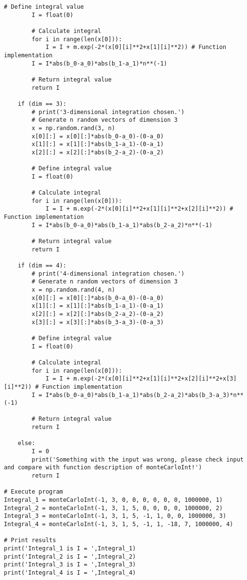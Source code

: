 \documentclass[a4paper,12pt]{article}
\begin{document}
\begin{Verbatim}[breaklines = true, breakanywhere = true]
		# Define integral value
		I = float(0)
		
		# Calculate integral
		for i in range(len(x[0])):
			I = I + m.exp(-2*(x[0][i]**2+x[1][i]**2)) # Function implementation
		I = I*abs(b_0-a_0)*abs(b_1-a_1)*n**(-1)
		
		# Return integral value
		return I
	
	if (dim == 3):
		# print('3-dimensional integration chosen.')
		# Generate n random vectors of dimension 3
		x = np.random.rand(3, n)
		x[0][:] = x[0][:]*abs(b_0-a_0)-(0-a_0)
		x[1][:] = x[1][:]*abs(b_1-a_1)-(0-a_1)
		x[2][:] = x[2][:]*abs(b_2-a_2)-(0-a_2)

		# Define integral value
		I = float(0)
		
		# Calculate integral
		for i in range(len(x[0])):
			I = I + m.exp(-2*(x[0][i]**2+x[1][i]**2+x[2][i]**2)) # Function implementation
		I = I*abs(b_0-a_0)*abs(b_1-a_1)*abs(b_2-a_2)*n**(-1)
		
		# Return integral value
		return I
	
	if (dim == 4):
		# print('4-dimensional integration chosen.')
		# Generate n random vectors of dimension 3
		x = np.random.rand(4, n)
		x[0][:] = x[0][:]*abs(b_0-a_0)-(0-a_0)
		x[1][:] = x[1][:]*abs(b_1-a_1)-(0-a_1)
		x[2][:] = x[2][:]*abs(b_2-a_2)-(0-a_2)
		x[3][:] = x[3][:]*abs(b_3-a_3)-(0-a_3)

		# Define integral value
		I = float(0)
		
		# Calculate integral
		for i in range(len(x[0])):
			I = I + m.exp(-2*(x[0][i]**2+x[1][i]**2+x[2][i]**2+x[3][i]**2)) # Function implementation
		I = I*abs(b_0-a_0)*abs(b_1-a_1)*abs(b_2-a_2)*abs(b_3-a_3)*n**(-1)
		
		# Return integral value
		return I
	
	else:
		I = 0
		print('Something with the input was wrong, please check input and compare with function description of monteCarloInt!')
		return I

# Execute program
Integral_1 = monteCarloInt(-1, 3, 0, 0, 0, 0, 0, 0, 1000000, 1)
Integral_2 = monteCarloInt(-1, 3, 1, 5, 0, 0, 0, 0, 1000000, 2)
Integral_3 = monteCarloInt(-1, 3, 1, 5, -1, 1, 0, 0, 1000000, 3)
Integral_4 = monteCarloInt(-1, 3, 1, 5, -1, 1, -18, 7, 1000000, 4)

# Print results
print('Integral_1 is I = ',Integral_1)
print('Integral_2 is I = ',Integral_2)
print('Integral_3 is I = ',Integral_3)
print('Integral_4 is I = ',Integral_4)
\end{Verbatim}
\end{document}
